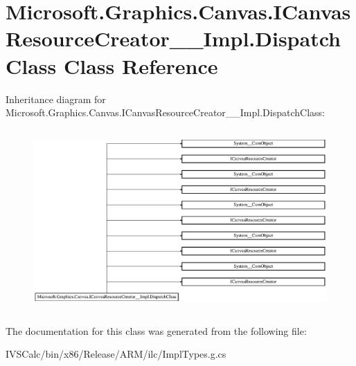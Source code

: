 \hypertarget{class_microsoft_1_1_graphics_1_1_canvas_1_1_i_canvas_resource_creator_____impl_1_1_dispatch_class}{}\section{Microsoft.\+Graphics.\+Canvas.\+I\+Canvas\+Resource\+Creator\+\_\+\+\_\+\+Impl.\+Dispatch\+Class Class Reference}
\label{class_microsoft_1_1_graphics_1_1_canvas_1_1_i_canvas_resource_creator_____impl_1_1_dispatch_class}
Inheritance diagram for Microsoft.\+Graphics.\+Canvas.\+I\+Canvas\+Resource\+Creator\+\_\+\+\_\+\+Impl.\+Dispatch\+Class\+:\begin{figure}[H]
\begin{center}
\leavevmode
\includegraphics[height=6.968326cm]{class_microsoft_1_1_graphics_1_1_canvas_1_1_i_canvas_resource_creator_____impl_1_1_dispatch_class}
\end{center}
\end{figure}


The documentation for this class was generated from the following file\+:\begin{DoxyCompactItemize}
\item 
I\+V\+S\+Calc/bin/x86/\+Release/\+A\+R\+M/ilc/Impl\+Types.\+g.\+cs\end{DoxyCompactItemize}
